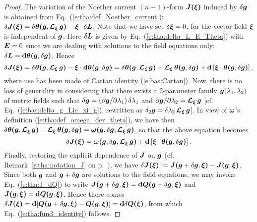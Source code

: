 \begin{proof}
The variation of the Noether current $(n-1)$-form $\bm{J}\textbf{(}\bm{\xi}\textbf{)}$ induced by
$\delta\bm{g}$ is obtained from Eq.~(\ref{e:tha:def_Noether_current}):
$\delta \bm{J}\textbf{(}\bm{\xi}\textbf{)} = \delta \bm{\theta}\textbf{(}\bm{g},\bm{\mathcal{L}}_{\bm{\xi}}\,\bm{g}\textbf{)}
    - \bm{\xi}\cdot\delta\bm{L}$.
Note that we have set $\delta\bm{\xi} = 0$, for the vector field $\bm{\xi}$ is
independent of $\bm{g}$.
Here $\delta\bm{L}$ is given by Eq.~(\ref{e:tha:delta_L_E_Theta}) with $\bm{E} = 0$
since we are dealing with solutions to the field equations only:
$\delta\bm{L} = \mathbf{d} \bm{\theta}\textbf{(}\bm{g},\delta\bm{g}\textbf{)}$.
Hence
\[
    \delta \bm{J}\textbf{(}\bm{\xi}\textbf{)} = \delta \bm{\theta}\textbf{(}\bm{g},\bm{\mathcal{L}}_{\bm{\xi}}\,\bm{g}\textbf{)}
    - \bm{\xi}\cdot \mathbf{d} \bm{\theta}\textbf{(}\bm{g},\delta\bm{g}\textbf{)}
    = \delta \bm{\theta}\textbf{(}\bm{g},\bm{\mathcal{L}}_{\bm{\xi}}\,\bm{g}\textbf{)} - \bm{\mathcal{L}}_{\bm{\xi}}\, \bm{\theta}\textbf{(}\bm{g},\delta\bm{g}\textbf{)} + \mathbf{d}\left[ \bm{\xi}\cdot \bm{\theta}\textbf{(}\bm{g},\delta\bm{g}\textbf{)} \right] ,
\]
where use has been made of Cartan identity (\ref{e:bas:Cartan}).
Now, there is no loss of generality in considering that there exists
a 2-parameter family $\bm{g}(\lambda_1,\lambda_2)$ of metric fields such that
$\delta\bm{g} = ({\partial \bm{g}}/{\partial \lambda_1}) \, \delta\lambda_1$ and
${\partial \bm{g}}/{\partial \lambda_2} = \bm{\mathcal{L}}_{\bm{\xi}}\,\bm{g}$ [cf. Eq.~(\ref{e:bas:delta_g_Lie_xi_g}),
rewritten as $\delta_2 \bm{g} =  \delta\lambda_2 \, \bm{\mathcal{L}}_{\bm{\xi}}\,\bm{g}$].
In view of $\bm{\omega}$'s definition (\ref{e:tha:def_omega_der_theta}),
we have then $\delta \bm{\theta}\textbf{(}\bm{g},\bm{\mathcal{L}}_{\bm{\xi}}\,\bm{g}\textbf{)} - \bm{\mathcal{L}}_{\bm{\xi}}\, \bm{\theta}\textbf{(}\bm{g},\delta\bm{g}\textbf{)} = \bm{\omega}\textbf{(}\bm{g},\delta\bm{g}, \bm{\mathcal{L}}_{\bm{\xi}}\,\bm{g}\textbf{)}$, so that
the above equation becomes
\[
    \delta \bm{J}\textbf{(}\bm{\xi}\textbf{)} = \bm{\omega}\textbf{(}\bm{g},\delta\bm{g}, \bm{\mathcal{L}}_{\bm{\xi}}\,\bm{g}\textbf{)}
        + \mathbf{d}\left[ \bm{\xi}\cdot \bm{\theta}\textbf{(}\bm{g},\delta\bm{g}\textbf{)} \right] .
\]
Finally, restoring the explicit dependence of $\bm{J}$ on $\bm{g}$
(cf. Remark~\ref{r:tha:notation_J} on p.~\pageref{r:tha:notation_J}),
we have
$\delta \bm{J}\textbf{(}\bm{\xi}\textbf{)} :=
\bm{J}\textbf{(}\bm{g}+\delta\bm{g},\bm{\xi}\textbf{)} - \bm{J}\textbf{(}\bm{g},\bm{\xi}\textbf{)}$.
Since both $\bm{g}$ and $\bm{g}+\delta\bm{g}$ are
solutions to the field equations, we may invoke
Eq.~(\ref{e:tha:J_dQ}) to write
$\bm{J}\textbf{(}\bm{g}+\delta\bm{g},\bm{\xi}\textbf{)} = \mathbf{d}  \bm{Q}\textbf{(}\bm{g}+\delta\bm{g},\bm{\xi}\textbf{)}$
and
$\bm{J}\textbf{(}\bm{g},\bm{\xi}\textbf{)} = \mathbf{d}  \bm{Q}\textbf{(}\bm{g},\bm{\xi}\textbf{)}$.
Hence there comes
$\delta \bm{J}\textbf{(}\bm{\xi}\textbf{)} = \mathbf{d}[\bm{Q}\textbf{(}\bm{g}+\delta\bm{g},\bm{\xi}\textbf{)} -
 \bm{Q}\textbf{(}\bm{g},\bm{\xi}\textbf{)}] = \mathbf{d} \delta \bm{Q}\textbf{(}\bm{\xi}\textbf{)}$,
from which Eq.~(\ref{e:tha:fund_identity}) follows.
\end{proof}

